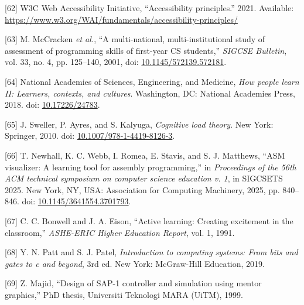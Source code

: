 \documentclass[12pt,oneside]{templates/unerthesis}
\newcommand{\CSLLeftMargin}[1]{#1} %
\newcommand{\CSLRightInline}[1]{#1} %
\newlength{\cslhangindent}
\newenvironment{CSLReferences}[2] %
 {\setlength{\parindent}{0pt}%
  \setlength{\leftskip}{#1 pt\relax}%
  \setlength{\parskip}{#2 pt\relax}%
  \everypar{\setlength{\hangindent}{\cslhangindent}}}
 {\par}
\begin{document}
\begin{CSLReferences}{0}{0}
\leavevmode{}%
\CSLLeftMargin{{[}62{]} }%
\CSLRightInline{W3C Web Accessibility Initiative, {``Accessibility principles.''} 2021. Available: \url{https://www.w3.org/WAI/fundamentals/accessibility-principles/}}

\leavevmode{}%
\CSLLeftMargin{{[}63{]} }%
\CSLRightInline{M. McCracken \emph{et al.}, {``A multi-national, multi-institutional study of assessment of programming skills of first-year CS students,''} \emph{SIGCSE Bulletin}, vol. 33, no. 4, pp. 125--140, 2001, doi: \href{https://doi.org/10.1145/572139.572181}{10.1145/572139.572181}.}

\leavevmode{}%
\CSLLeftMargin{{[}64{]} }%
\CSLRightInline{National Academies of Sciences, Engineering, and Medicine, \emph{How people learn II: Learners, contexts, and cultures}. Washington, DC: National Academies Press, 2018. doi: \href{https://doi.org/10.17226/24783}{10.17226/24783}.}

\leavevmode{}%
\CSLLeftMargin{{[}65{]} }%
\CSLRightInline{J. Sweller, P. Ayres, and S. Kalyuga, \emph{Cognitive load theory}. New York: Springer, 2010. doi: \href{https://doi.org/10.1007/978-1-4419-8126-3}{10.1007/978-1-4419-8126-3}.}

\leavevmode{}%
\CSLLeftMargin{{[}66{]} }%
\CSLRightInline{T. Newhall, K. C. Webb, I. Romea, E. Stavis, and S. J. Matthews, {``ASM visualizer: A learning tool for assembly programming,''} in \emph{Proceedings of the 56th ACM technical symposium on computer science education v. 1}, in SIGCSETS 2025. New York, NY, USA: Association for Computing Machinery, 2025, pp. 840--846. doi: \href{https://doi.org/10.1145/3641554.3701793}{10.1145/3641554.3701793}.}

\leavevmode{}%
\CSLLeftMargin{{[}67{]} }%
\CSLRightInline{C. C. Bonwell and J. A. Eison, {``Active learning: Creating excitement in the classroom,''} \emph{ASHE-ERIC Higher Education Report}, vol. 1, 1991.}

\leavevmode{}%
\CSLLeftMargin{{[}68{]} }%
\CSLRightInline{Y. N. Patt and S. J. Patel, \emph{Introduction to computing systems: From bits and gates to c and beyond}, 3rd ed. New York: McGraw-Hill Education, 2019.}

\leavevmode{}%
\CSLLeftMargin{{[}69{]} }%
\CSLRightInline{Z. Majid, {``Design of SAP-1 controller and simulation using mentor graphics,''} PhD thesis, Universiti Teknologi MARA (UiTM), 1999.}


\end{CSLReferences}
\end{document}
